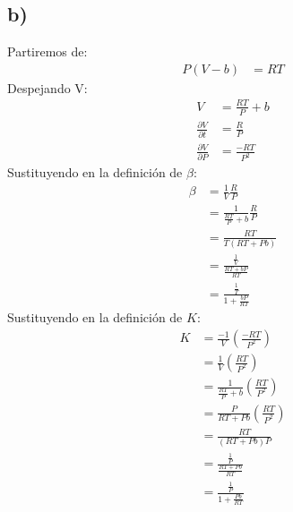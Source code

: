 \documentclass{article}
\begin{document}
\begin{tcolorbox}[breakable]
    \subsection*{b)}
     Partiremos de:
    \begin{align*}
        P(V-b) &= RT 
    \end{align*}
    Despejando V:
    \begin{align*}
        V 
        &= \frac{RT}{P} + b \\
        \frac{\partial V}{\partial t} 
        &= \frac{R}{P}    \\ 
        \frac{\partial V}{\partial P} 
        &= \frac{-RT}{P^2}    
    \end{align*}
    Sustituyendo en la definición de $\beta$:
    \begin{align*}
        \beta 
        &= \frac{1}{V} \frac{R}{P} \\ 
        &= \frac{1}{\frac{RT}{P}+b} \frac{R}{P} \\  
        &= \frac{RT}{T(RT+Pb)} \\ 
        &= \frac{\frac{1}{V}}{\frac{RT+bP}{RT}} \\
        &= \frac{\frac{1}{T}}{1+\frac{bP}{RT}}
    \end{align*}
    Sustituyendo en la definición de $K$:
    \begin{align*}
        K 
        &= \frac{-1}{V}\left( \frac{-RT}{P^2} \right) \\
        &= \frac{1}{V}\left(\frac{RT}{P^2}\right) \\
        &= \frac{1}{\frac{RT}{P}+b} \left(\frac{RT}{P^2}\right) \\
        &= \frac{P}{RT+Pb} \left(\frac{RT}{P^2}\right) \\
        &=\frac{RT}{(RT+Pb)P}\\
        &= \frac{\frac{1}{P}}{\frac{RT+Pb}{RT}} \\
        &= \frac{\frac{1}{P}}{1+\frac{Pb}{RT}}
    \end{align*}
\end{tcolorbox}
\end{document}
